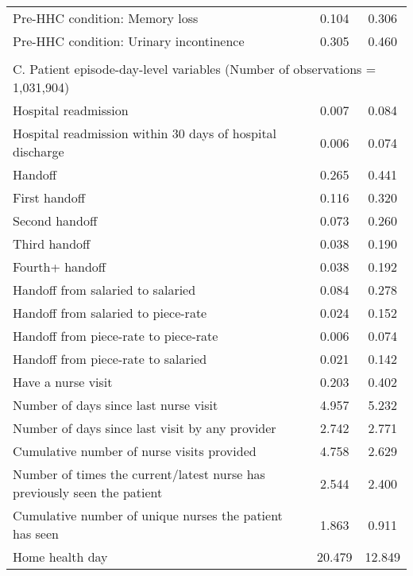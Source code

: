 \documentclass[final,12pt, notitlepage]{article}
\begin{document}
\begin{singlespace}
{\begin{longtable}{lcc}
Pre-HHC condition: Memory loss & 0.104 & 0.306 \\
Pre-HHC condition: Urinary incontinence & 0.305 & 0.460 \\
\\
\multicolumn{3}{l}{C. Patient episode-day-level variables (Number of observations = 1,031,904)} \\
Hospital readmission & 0.007 & 0.084 \\
Hospital readmission within 30 days of hospital discharge & 0.006 & 0.074 \\
Handoff & 0.265 & 0.441 \\
First handoff & 0.116 & 0.320 \\
Second handoff & 0.073 & 0.260 \\
Third handoff & 0.038 & 0.190 \\
Fourth+ handoff & 0.038 & 0.192 \\
Handoff from salaried to salaried & 0.084 & 0.278 \\
Handoff from salaried to piece-rate & 0.024 & 0.152 \\
Handoff from piece-rate to piece-rate & 0.006 & 0.074 \\
Handoff from piece-rate to salaried & 0.021 & 0.142 \\
Have a nurse visit & 0.203 & 0.402 \\
Number of days since last nurse visit & 4.957 & 5.232 \\
Number of days since last visit by any provider & 2.742 & 2.771 \\
Cumulative number of nurse visits provided & 4.758 & 2.629 \\
Number of times the current/latest nurse has previously seen the patient & 2.544 & 2.400 \\
Cumulative number of unique nurses the patient has seen & 1.863 & 0.911 \\
Home health day & 20.479 & 12.849 \\
\bottomrule
\end{longtable}
}



\end{singlespace}
\end{document}
